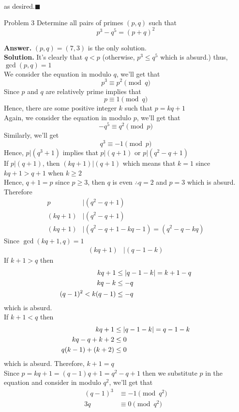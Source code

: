 \documentclass[12pt]{article}
\begin{document}
as desired.\null\hfill $\blacksquare$
\newpage
\begin{mybox}{Problem 3}
Determine all pairs of primes $(p,q)$ such that $$p^3-q^5=(p+q)^2$$
\end{mybox}
\textbf{Answer.} $(p,q)=(7,3)$ is the only solution.\\
\textbf{Solution.} It's clearly that $q<p$ (otherwise, $p^3 \leq q^5$ which is absurd.) thus, $\gcd(p,q)=1$ \\
We consider the equation in modulo $q$, we'll get that $$p^3 \equiv p^2 \pmod q$$ 
Since $p$ and $q$ are relatively prime implies that
$$p \equiv 1 \pmod q$$ 
Hence, there are some positive integer $k$ such that $p=kq+1$\\
Again, we consider the equation in modulo $p$, we'll get that $$-q^5 \equiv q^2 \pmod p$$ 
Similarly, we'll get $$q^3 \equiv -1 \pmod p$$ Hence, $p|(q^3+1)$ implies that $p|(q+1)$ or $p|(q^2-q+1)$\\
If $p|(q+1)$, then $(kq+1)|(q+1)$ which means that $k=1$ since $kq+1 > q+1$ when $k \geq 2$\\
Hence, $q+1 = p$ since $p \geq 3$, then $q$ is even $\therefore q=2$ and $p=3$ which is absurd.\\
Therefore 
\begin{align*}
p&|(q^2-q+1) \\
(kq+1)&|(q^2-q+1) \\
 (kq+1)&|(q^2-q+1-kq-1)=(q^2-q-kq)
\end{align*}
Since $\gcd(kq+1,q)=1$
\begin{align*}
(kq+1)&|(q-1-k)
\end{align*}
\newpage
If $k+1 > q$ then 
\begin{align*}
kq+1 &\leq \left\lvert q-1-k \right\rvert=k+1-q\\
 kq-k &\leq -q \\
(q-1)^2 < k(q-1) & \leq -q
\end{align*}
which is absurd.\\
If $k+1 < q$ then 
\begin{align*}
kq+1 &\leq \left\lvert q-1-k \right\rvert=q-1-k\\
 kq-q+k+2 &\leq 0 \\
q(k-1)+(k+2) &\leq 0
\end{align*}
which is absurd. Therefore, $k+1=q$\\
Since $p=kq+1 = (q-1)q+1 = q^2-q+1$ then we substitute $p$ in the equation and consider in modulo $q^2$, we'll get that 
\begin{align*}
(q-1)^3 &\equiv -1 \pmod {q^2}\\
3q &\equiv 0 \pmod {q^2}
\end{align*}
\end{document}
